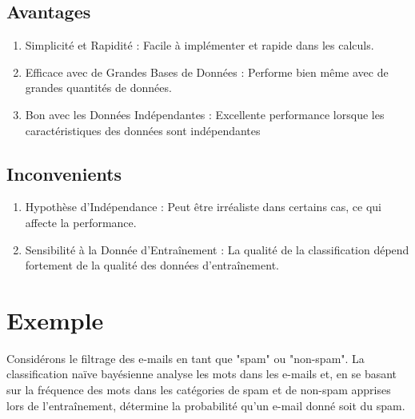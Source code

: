 \documentclass[a0,portrait]{a0poster}
\begin{document}

\subsection*{Avantages}

\begin{enumerate}
    \item Simplicité et Rapidité : Facile à implémenter et rapide dans les calculs.
    \item Efficace avec de Grandes Bases de Données : Performe bien même avec de grandes quantités de données.
    \item Bon avec les Données Indépendantes : Excellente performance lorsque les caractéristiques des données sont indépendantes
\end{enumerate}

\subsection*{Inconvenients}

\begin{enumerate}
    \item Hypothèse d'Indépendance : Peut être irréaliste dans certains cas, ce qui affecte la performance.
    \item Sensibilité à la Donnée d'Entraînement : La qualité de la classification dépend fortement de la qualité des données d'entraînement.
\end{enumerate}


\section*{Exemple}

Considérons le filtrage des e-mails en tant que "spam" ou "non-spam". La classification naïve bayésienne analyse les mots dans les e-mails et, en se basant sur la fréquence des mots dans les catégories de spam et de non-spam apprises lors de l'entraînement, détermine la probabilité qu'un e-mail donné soit du spam.

\end{document}
